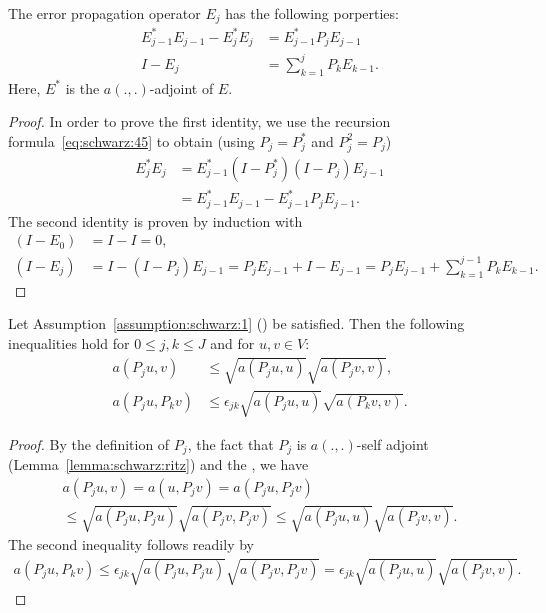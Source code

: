 \begin{lemma}
  \label{lemma:schwarz:9}
  The error propagation operator $E_j$ has the following porperties:
  \begin{align}
    \label{eq:schwarz:44}
    E^*_{j-1}E_{j-1} - E^*_{j}E_{j} &= E^*_{j-1} P_j E_{j-1}
    \\
    \label{eq:schwarz:46}
    I - E_j &= \sum_{k=1}^{j} P_k E_{k-1}.
  \end{align}
  Here, $E^*$ is the $a(.,.)$-adjoint of $E$.
\end{lemma}

\begin{proof}
  In order to prove the first identity, we use the recursion
  formula~\eqref{eq:schwarz:45} to obtain (using $P_j = P_j^*$
  and $P_j^2 = P_j$)
  \begin{align*}
    E^*_{j}E_{j} &= E^*_{j-1} (I-P_j^*) (I-P_j) E_{j-1} \\
    &= E^*_{j-1} E_{j-1} - E^*_{j-1}P_jE_{j-1}.
  \end{align*}
  The second identity is proven by induction with
  \begin{align*}
    (I-E_0) &= I - I = 0, \\
    (I-E_j) &= I-(I-P_j) E_{j-1} = P_j  E_{j-1} + I - E_{j-1} = P_j
    E_{j-1} +\sum_{k=1}^{j-1} P_k E_{k-1}.
  \end{align*}
\end{proof}

\begin{lemma}
  \label{lemma:schwarz:10}
  Let Assumption~\ref{assumption:schwarz:1} () be satisfied. Then the following
  inequalities hold for $0\le j,k \le J$ and for $u,v\in V$:
  \begin{align}
    a(P_j u,v) &\le \sqrt{a(P_j u,u)} \sqrt{a(P_j v,v)}, \\
    a(P_j u,P_k v) &\le \epsilon_{jk}
    \sqrt{a(P_j u,u)} \sqrt{a(P_k v,v)}.
  \end{align}
\end{lemma}

\begin{proof}
  By the definition of $P_j$, the fact that $P_j$ is $a(.,.)$-self
  adjoint (Lemma~\ref{lemma:schwarz:ritz}) and the , we have
  \begin{multline*}
    a(P_j u,v) = a(u, P_j v) = a(P_j u, P_j v)
    \\
    \le \sqrt{a(P_j u,P_j u)} \sqrt{a(P_j v,P_j v)}
    \le \sqrt{a(P_j u,u)} \sqrt{a(P_j v,v)}.
  \end{multline*}
  The second inequality follows readily by
  \begin{gather*}
    a(P_j u,P_k v)
    \le \epsilon_{jk}\sqrt{a(P_j u,P_j u)} \sqrt{a(P_j v,P_j v)}
    = \epsilon_{jk}\sqrt{a(P_j u,u)} \sqrt{a(P_j v,v)}.
  \end{gather*}
\end{proof}

